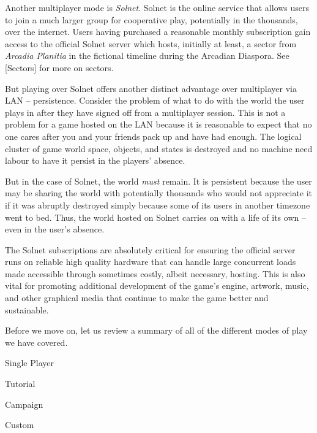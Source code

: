 

Another multiplayer mode is {\it Solnet}. Solnet is the online service that allows users to join a much larger group for cooperative play, potentially in the thousands, over the internet. Users having purchased a reasonable monthly subscription gain access to the official Solnet server which hosts, initially at least, a sector from {\it Arcadia Planitia} in the fictional timeline during the Arcadian Diaspora. See [Sectors] for more on sectors.

But playing over Solnet offers another distinct advantage over multiplayer via LAN -- persistence. Consider the problem of what to do with the world the user plays in after they have signed off from a multiplayer session. This is not a problem for a game hosted on the LAN because it is reasonable to expect that no one cares after you and your friends pack up and have had enough. The logical cluster of game world space, objects, and states is destroyed and no machine need labour to have it persist in the players' absence.

But in the case of Solnet, the world {\it must} remain. It is persistent because the user may be sharing the world with potentially thousands who would not appreciate it if it was abruptly destroyed simply because some of its users in another timezone went to bed. Thus, the world hosted on Solnet carries on with a life of its own -- even in the user's absence.

The Solnet subscriptions are absolutely critical for ensuring the official server runs on reliable high quality hardware that can handle large concurrent loads made accessible through sometimes costly, albeit necessary, hosting. This is also vital for promoting additional development of the game's engine, artwork, music, and other graphical media that continue to make the game better and sustainable.

Before we move on, let us review a summary of all of the different modes of play we have covered.

\startitemize[4]
    \item Single Player
        \startitemize[4]
        \item Tutorial
        \item Campaign
        \item Custom
        \stopitemize

